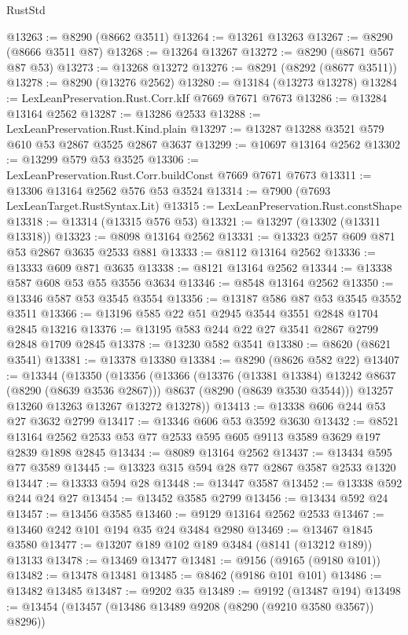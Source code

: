 \begin{lexlean}{RustStd}
\begin{coremodule}
@13263 := @8290 (@8662 @3511)
@13264 := @13261 @13263
@13267 := @8290 (@8666 @3511 @87)
@13268 := @13264 @13267
@13272 := @8290 (@8671 @567 @87 @53)
@13273 := @13268 @13272
@13276 := @8291 (@8292 (@8677 @3511))
@13278 := @8290 (@13276 @2562)
@13280 := @13184 (@13273 @13278)
@13284 := LexLeanPreservation.Rust.Corr.kIf @7669 @7671 @7673
@13286 := @13284 @13164 @2562
@13287 := @13286 @2533
@13288 := LexLeanPreservation.Rust.Kind.plain
@13297 := @13287 @13288 @3521 @579 @610 @53 @2867 @3525 @2867 @3637
@13299 := @10697 @13164 @2562
@13302 := @13299 @579 @53 @3525
@13306 := LexLeanPreservation.Rust.Corr.buildConst @7669 @7671 @7673
@13311 := @13306 @13164 @2562 @576 @53 @3524
@13314 := @7900 (@7693 LexLeanTarget.RustSyntax.Lit)
@13315 := LexLeanPreservation.Rust.constShape
@13318 := @13314 (@13315 @576 @53)
@13321 := @13297 (@13302 (@13311 @13318))
@13323 := @8098 @13164 @2562
@13331 := @13323 @257 @609 @871 @53 @2867 @3635 @2533 @881
@13333 := @8112 @13164 @2562
@13336 := @13333 @609 @871 @3635
@13338 := @8121 @13164 @2562
@13344 := @13338 @587 @608 @53 @55 @3556 @3634
@13346 := @8548 @13164 @2562
@13350 := @13346 @587 @53 @3545 @3554
@13356 := @13187 @586 @87 @53 @3545 @3552 @3511
@13366 := @13196 @585 @22 @51 @2945 @3544 @3551 @2848 @1704 @2845 @13216
@13376 := @13195 @583 @244 @22 @27 @3541 @2867 @2799 @2848 @1709 @2845
@13378 := @13230 @582 @3541
@13380 := @8620 (@8621 @3541)
@13381 := @13378 @13380
@13384 := @8290 (@8626 @582 @22)
@13407 := @13344
    (@13350
      (@13356
        (@13366
          (@13376 (@13381 @13384) @13242 @8637 (@8290 (@8639 @3536 @2867)))
          @8637
          (@8290 (@8639 @3530 @3544)))
        @13257
        @13260
        @13263
        @13267
        @13272
        @13278))
@13413 := @13338 @606 @244 @53 @27 @3632 @2799
@13417 := @13346 @606 @53 @3592 @3630
@13432 := @8521 @13164 @2562 @2533 @53 @77 @2533 @595 @605 @9113 @3589 @3629 @197 @2839 @1898 @2845
@13434 := @8089 @13164 @2562
@13437 := @13434 @595 @77 @3589
@13445 := @13323 @315 @594 @28 @77 @2867 @3587 @2533 @1320
@13447 := @13333 @594 @28
@13448 := @13447 @3587
@13452 := @13338 @592 @244 @24 @27
@13454 := @13452 @3585 @2799
@13456 := @13434 @592 @24
@13457 := @13456 @3585
@13460 := @9129 @13164 @2562 @2533
@13467 := @13460 @242 @101 @194 @35 @24 @3484 @2980
@13469 := @13467 @1845 @3580
@13477 := @13207 @189 @102 @189 @3484 (@8141 (@13212 @189)) @13133
@13478 := @13469 @13477
@13481 := @9156 (@9165 (@9180 @101))
@13482 := @13478 @13481
@13485 := @8462 (@9186 @101 @101)
@13486 := @13482 @13485
@13487 := @9202 @35
@13489 := @9192 (@13487 @194)
@13498 := @13454 (@13457 (@13486 @13489 @9208 (@8290 (@9210 @3580 @3567)) @8296))

\end{coremodule}
\end{lexlean}
